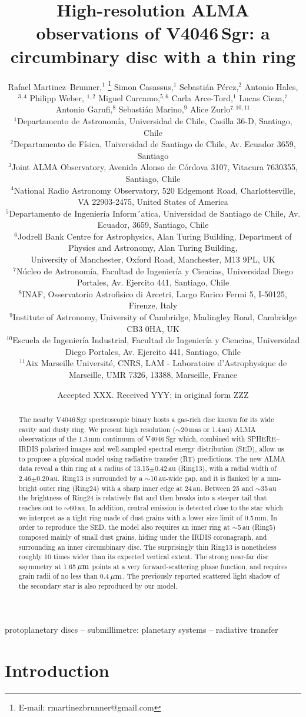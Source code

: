 \documentclass[fleqn,usenatbib,useAMS]{mnras}
\title[High-resolution ALMA observations of V4046\,Sgr]{High-resolution ALMA observations of V4046\,Sgr: a circumbinary disc with a thin ring}
\author[R. Martinez Brunner et al.]{Rafael Martinez--Brunner,$^{1}$
\thanks{E-mail: rmartinezbrunner@gmail.com}
Simon Casassus,$^{1}$
Sebasti\'an P\'erez,$^{2}$
Antonio Hales,$^{3,4}$
Philipp Weber, $^{1,2}$ \newauthor
Miguel Carcamo,$^{5,6}$
Carla Arce-Tord,$^{1}$
Lucas Cieza,$^{7}$
Antonio Garufi,$^{8}$
Sebasti\'an Marino,$^{9}$
Alice Zurlo$^{7,10,11}$
\\
$^{1}$Departamento de Astronom\'ia, Universidad de Chile, Casilla 36-D, Santiago, Chile\\
$^{2}$Departamento de F\'isica, Universidad de Santiago de Chile, Av. Ecuador 3659, Santiago\\
$^{3}$Joint ALMA Observatory, Avenida Alonso de C\'ordova 3107, Vitacura 7630355, Santiago, Chile \\
$^{4}$National Radio Astronomy Observatory, 520 Edgemont Road, Charlottesville, VA 22903-2475, United States of America \\
$^{5}$Departamento de Ingenier\'ia Inform´atica, Universidad de Santiago de Chile, Av. Ecuador, 3659, Santiago, Chile\\
$^{6}$Jodrell Bank Centre for Astrophysics, Alan Turing Building, Department of Physics and Astronomy, Alan Turing Building,\\ University of Manchester, Oxford Road, Manchester, M13 9PL, UK \\
$^{7}$N\'ucleo de Astronom\'ia, Facultad de Ingenier\'ia y Ciencias, Universidad Diego Portales, Av. Ejercito 441, Santiago, Chile\\
$^{8}$INAF, Osservatorio Astrofisico di Arcetri, Largo Enrico Fermi 5, I-50125, Firenze, Italy\\
$^{9}$Institute of Astronomy, University of Cambridge, Madingley Road, Cambridge CB3 0HA, UK\\
$^{10}$Escuela de Ingenier\'ia Industrial, Facultad de Ingenier\'ia y Ciencias, Universidad Diego Portales, Av. Ejercito 441, Santiago, Chile \\
$^{11}$Aix Marseille Universit\'e, CNRS, LAM - Laboratoire d'Astrophysique de Marseille, UMR 7326, 13388, Marseille, France  \\
}
\date{Accepted XXX. Received YYY; in original form ZZZ}
\begin{document}
\label{firstpage}
\pagerange{\pageref{firstpage}--\pageref{lastpage}}
\maketitle

\begin{abstract}
    The nearby V4046\,Sgr spectroscopic binary hosts a gas-rich disc known for its wide cavity and dusty ring. We present high resolution ($\sim$20\,mas or 1.4\,au) ALMA observations of the 1.3\,mm continuum of V4046\,Sgr which, combined with SPHERE--IRDIS polarized images and well-sampled spectral energy distribution (SED), allow us to propose a physical model using radiative transfer (RT) predictions. The new ALMA data reveal a thin ring at a radius of 13.15$\pm$0.42\,au (Ring13), with a radial width of 2.46$\pm$0.20\,au. Ring13 is surrounded by a $\sim$10\,au-wide gap, and it is flanked by a mm-bright outer ring (Ring24) with a sharp inner edge at 24\,au. Between 25 and $\sim$35\,au the brightness of Ring24 is relatively flat and then breaks into a steeper tail that reaches out to $\sim$60\,au. In addition, central emission is detected close to the star which we interpret as a tight ring made of dust grains with a lower size limit of 0.5\,mm. In order to reproduce the SED, the model also requires an inner ring at $\sim$5\,au (Ring5) composed mainly of small dust grains, hiding under the IRDIS coronagraph, and surrounding an inner circumbinary disc. The surprisingly thin Ring13 is nonetheless roughly 10 times wider than its expected vertical extent. The strong near-far disc asymmetry at 1.65\,$\hbox{$\mu$m}$ points at a very forward-scattering phase function, and requires grain radii of no less than 0.4\,$\hbox{$\mu$m}$. The previously reported scattered light shadow of the secondary star is also reproduced by our model.
\end{abstract}

\begin{keywords}
 protoplanetary discs -- submillimetre: planetary systems -- radiative transfer
\end{keywords}



\section{Introduction} \label{sec:Introduction}
\end{document}
